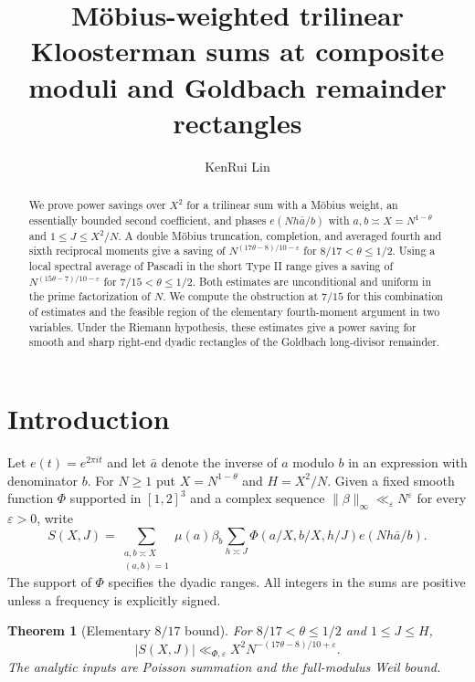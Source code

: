 \documentclass[11pt]{amsart}
\title[M\"obius-weighted trilinear Kloosterman sums]{M\"obius-weighted trilinear Kloosterman sums at composite moduli and Goldbach remainder rectangles}
\author{KenRui Lin}
\date{}
\numberwithin{equation}{section}
\newtheorem{theorem}{Theorem}[section]
\theoremstyle{remark}
\begin{document}
\begin{abstract}
We prove power savings over \(X^2\) for a trilinear sum with a M\"obius
weight, an essentially bounded second coefficient, and phases
\(e(Nh\bar a/b)\) with \(a,b\asymp X=N^{1-\theta}\) and
\(1\le J\le X^2/N\). A double M\"obius truncation, completion, and
averaged fourth and sixth reciprocal moments give a saving of
\(N^{(17\theta-8)/10-\varepsilon}\) for \(8/17<\theta\le1/2\).
Using a local spectral average of Pascadi in the short Type II range
gives a saving of \(N^{(15\theta-7)/10-\varepsilon}\) for
\(7/15<\theta\le1/2\). Both estimates are unconditional and uniform in
the prime factorization of \(N\). We compute the obstruction at
\(7/15\) for this combination of estimates and the feasible region
of the elementary fourth-moment argument in two variables.
Under the Riemann hypothesis, these estimates give a power saving
for smooth and sharp right-end dyadic rectangles of the Goldbach
long-divisor remainder.
\end{abstract}
\maketitle

\section{Introduction}

Let \(e(t)=e^{2\pi it}\) and let \(\bar a\) denote the inverse of \(a\)
modulo \(b\) in an expression with denominator \(b\). For \(N\ge1\) put
\(X=N^{1-\theta}\) and \(H=X^2/N\). Given a fixed smooth function
\(\Phi\) supported in \([1,2]^3\) and a complex sequence
\(\|\beta\|_\infty\ll_\varepsilon N^\varepsilon\) for every \(\varepsilon>0\),
write
\begin{equation}\label{eq:main-sum}
 S(X,J)=
 \sum_{\substack{a,b\asymp X\\(a,b)=1}}\mu(a)\beta_b
 \sum_{h\asymp J}\Phi(a/X,b/X,h/J)e(Nh\bar a/b).
\end{equation}
The support of \(\Phi\) specifies the dyadic ranges. All integers in
the sums are positive unless a frequency is explicitly signed.

\begin{theorem}[Elementary \(8/17\) bound]\label{thm:elementary}
For \(8/17<\theta\le1/2\) and \(1\le J\le H\),
\[
 |S(X,J)|\ll_{\Phi,\varepsilon} X^2 N^{-(17\theta-8)/10+\varepsilon}.
\]
The analytic inputs are Poisson summation and the full-modulus Weil
bound.
\end{theorem}
\end{document}
